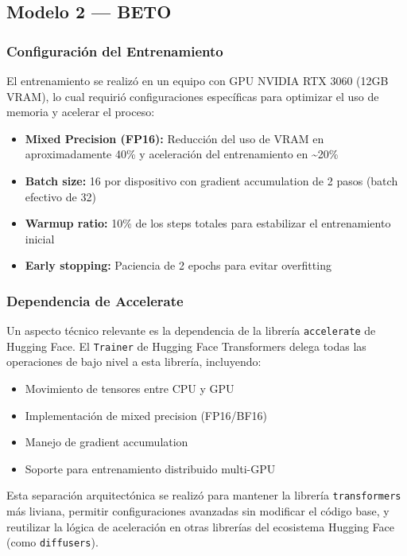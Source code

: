 \documentclass[11pt,a4paper]{article}
\begin{document}
\subsection{Modelo 2 --- BETO}

\subsubsection{Configuración del Entrenamiento}

El entrenamiento se realizó en un equipo con GPU NVIDIA RTX 3060 (12GB VRAM), lo cual requirió configuraciones específicas para optimizar el uso de memoria y acelerar el proceso:

\begin{itemize}
    \item \textbf{Mixed Precision (FP16):} Reducción del uso de VRAM en aproximadamente 40\% y aceleración del entrenamiento en \textasciitilde20\%
    \item \textbf{Batch size:} 16 por dispositivo con gradient accumulation de 2 pasos (batch efectivo de 32)
    \item \textbf{Warmup ratio:} 10\% de los steps totales para estabilizar el entrenamiento inicial
    \item \textbf{Early stopping:} Paciencia de 2 epochs para evitar overfitting
\end{itemize}

\subsubsection{Dependencia de Accelerate}

Un aspecto técnico relevante es la dependencia de la librería \texttt{accelerate} de Hugging Face. El \texttt{Trainer} de Hugging Face Transformers delega todas las operaciones de bajo nivel a esta librería, incluyendo:

\begin{itemize}
    \item Movimiento de tensores entre CPU y GPU
    \item Implementación de mixed precision (FP16/BF16)
    \item Manejo de gradient accumulation
    \item Soporte para entrenamiento distribuido multi-GPU
\end{itemize}

Esta separación arquitectónica se realizó para mantener la librería \texttt{transformers} más liviana, permitir configuraciones avanzadas sin modificar el código base, y reutilizar la lógica de aceleración en otras librerías del ecosistema Hugging Face (como \texttt{diffusers}).
\end{document}
